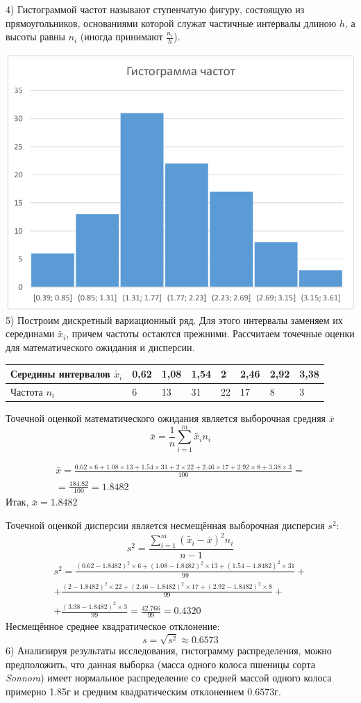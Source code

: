 \documentclass[a4paper,12pt]{article} %
\begin{document}
4) Гистограммой частот называют ступенчатую фигуру, состоящую из
прямоугольников, основаниями которой служат частичные интервалы длиною $h$, а
высоты равны $n_i$ (иногда принимают $\frac{n_i}{h}$).

\includegraphics[width=0.9\linewidth]{hist.png}\\
5) Построим дискретный вариационный ряд. Для этого интервалы заменяем их серединами
$\tilde{x_i}$, причем частоты остаются прежними. Рассчитаем точечные оценки для математического ожидания и дисперсии.\\
\begin{tabular}{ | l | l | l | l | l | l | l | l | }
  \hline
  Середины интервалов $\tilde{x_i}$ & 0,62 & 1,08 & 1,54 & 2 & 2,46 & 2,92 & 3,38 \\ \hline
  Частота $n_i$ & 6 & 13 & 31 & 22 & 17 & 8 & 3 \\ \hline
\end{tabular}

Точечной оценкой математического ожидания является выборочная средняя $\bar{x}$
\[
  \bar{x} = \frac{1}{n}\sum_{i=1}^m\tilde{x_i}n_i
\]

\begin{multline}
  \bar{x} = \frac{0.62\times6+1.08\times13+1.54\times31+2\times22+2.46\times17+2.92\times8+3.38\times3}{100}=\\
  =\frac{184.82}{100}=1.8482
\end{multline}
Итак, $\bar{x}=1.8482$

Точечной оценкой дисперсии является несмещённая выборочная дисперсия $s^2$:
\[
  s^2 = \dfrac{\sum_{i=1}^m(\tilde{x_i} - \bar{x})^2n_i}{n-1}
\]
\begin{multline}
  s^2 = \frac{(0.62-1.8482)^2\times6
  + (1.08-1.8482)^2\times13+(1.54-1.8482)^2\times31}{99}+\\
  + \frac{(2-1.8482)^2\times22+(2.46-1.8482)^2\times17+(2.92-1.8482)^2\times8}{99}+\\
  +\frac{(3.38-1.8482)^2\times3}{99} =\frac{42.766}{99}=0.4320
\end{multline}
Несмещённое среднее квадратическое отклонение:
\[
  s= \sqrt{s^2} \approx 0.6573
\]
6) Анализируя результаты исследования, гистограмму распределения, можно
предположить, что данная выборка (масса одного колоса пшеницы сорта \textit{Sonnora})
имеет нормальное распределение со средней массой одного колоса примерно 1.85г
и средним квадратическим отклонением $0.6573$г.
\end{document}
